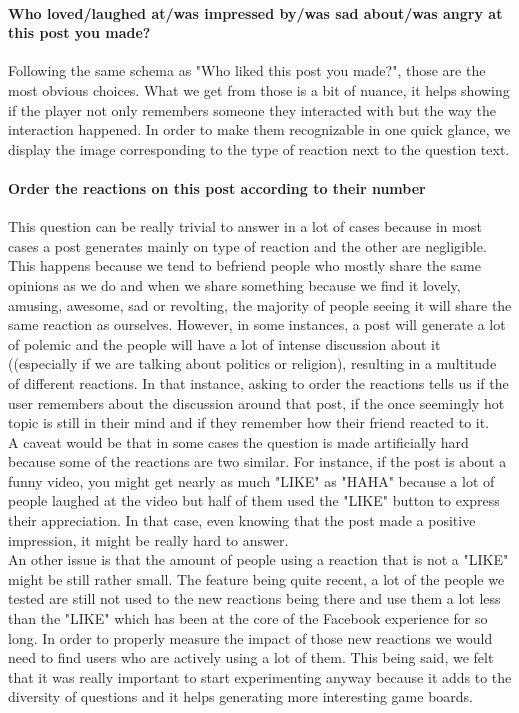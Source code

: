 \paragraph{Who loved/laughed at/was impressed by/was sad about/was angry at this post you made?}
Following the same schema as "Who liked this post you made?", those are the most obvious choices. What we get from those is a bit of nuance, it helps showing if the player not only remembers someone they interacted with but the way the interaction happened. In order to make them  recognizable in one quick glance, we display the image corresponding to the type of reaction next to the question text. 
\paragraph{Order the reactions on this post according to their number}
This question can be really trivial to answer in a lot of cases because in most cases a post generates mainly on type of reaction and the other are negligible. This happens because we tend to befriend people who mostly share the same opinions as we do and when we share something because we find it lovely, amusing, awesome, sad or revolting, the majority of people seeing it will share the same reaction as ourselves. However, in some instances, a post will generate a lot of polemic and the people will have a lot of intense discussion about it ((especially if we are talking about politics or religion), resulting in a multitude of different reactions. In that instance, asking to order the reactions tells us if the user remembers about the discussion around that post, if the once seemingly hot topic is still in their mind and if they remember how their friend reacted to it.\\
A caveat would be that in some cases the question is made artificially hard because some of the reactions are two similar. For instance, if the post is about a funny video, you might get nearly as much "LIKE" as "HAHA" because a lot of people laughed at the video but half of them used the "LIKE" button to express their appreciation. In that case, even knowing that the post made a positive impression, it might be really hard to answer.\\
An other issue is that the amount of people using a reaction that is not a "LIKE" might be still rather small. The feature being quite recent, a lot of the people we tested are still not used to the new reactions being there and use them a lot less than the "LIKE" which has been at the core of the Facebook experience for so long. In order to properly measure the impact of those new reactions we would need to find users who are actively using a lot of them. This being said, we felt that it was really important to start experimenting anyway because it adds to the diversity of questions and it helps generating more interesting game boards.
